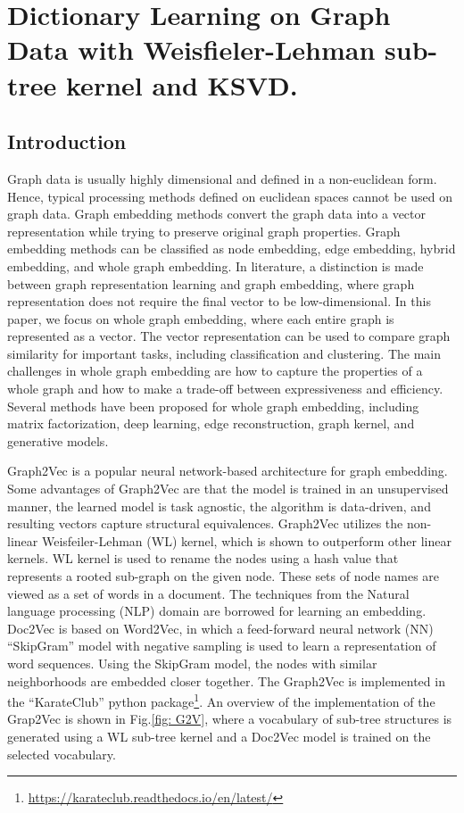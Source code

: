 \chapter{Dictionary Learning on Graph Data with Weisfieler-Lehman sub-tree kernel and KSVD\@.}

\section{Introduction}\label{intro}
Graph data is usually highly dimensional and defined in a non-euclidean form. Hence, typical processing methods defined on euclidean spaces cannot be used on graph data. Graph embedding methods convert the graph data into a vector representation while trying to preserve original graph properties\cite{Cai2018}.%
Graph embedding methods can be classified as node embedding, edge embedding, hybrid embedding, and whole graph embedding. In literature, a distinction is made between graph representation learning and graph embedding\cite{Cai2018, Chami2022}, where graph representation does not require the final vector to be low-dimensional. In this paper, we focus on whole graph embedding, where each entire graph is represented as a vector\cite{Maddalena2021}. The vector representation can be used to compare graph similarity for important tasks, including classification and clustering. The main challenges in whole graph embedding are how to capture the properties of a whole graph and how to make a trade-off between expressiveness and efficiency\cite{Cai2018}. Several methods have been proposed for whole graph embedding, including matrix factorization, deep learning, edge reconstruction, graph kernel, and generative models\cite{Cai2018, Maddalena2021}.

Graph2Vec is a popular neural network-based architecture for graph embedding\cite{Narayanan2017}. Some advantages of Graph2Vec are that the model is trained in an unsupervised manner, the learned model is task agnostic, the algorithm is data-driven, and resulting vectors capture structural equivalences. Graph2Vec utilizes the non-linear Weisfeiler-Lehman (WL) kernel\cite{weisfeiler1968reduction},
which is shown to outperform other linear kernels\cite{shervashidze2011weisfeiler, Yanardag2015}. WL kernel is used to rename the nodes using a hash value that represents a rooted sub-graph on the given node. These sets of node names are viewed as a set of words in a document. The techniques from the Natural language processing (NLP) domain are borrowed for learning an embedding. Doc2Vec is based on Word2Vec\cite{Mikolov2013}, in which a feed-forward neural network (NN) ``SkipGram'' model with negative sampling is used to learn a representation of word sequences\cite{Le2014}. Using the SkipGram model, the nodes with similar neighborhoods are embedded closer together\cite{Rong2014}. The Graph2Vec is implemented in the ``KarateClub'' python package\cite{Karateclub}\footnote{\url{https://karateclub.readthedocs.io/en/latest/}}. An overview of the implementation of the Grap2Vec is shown in Fig.\ref{fig: G2V}, where a vocabulary of sub-tree structures is generated using a WL sub-tree kernel and a Doc2Vec model is trained on the selected vocabulary. 

